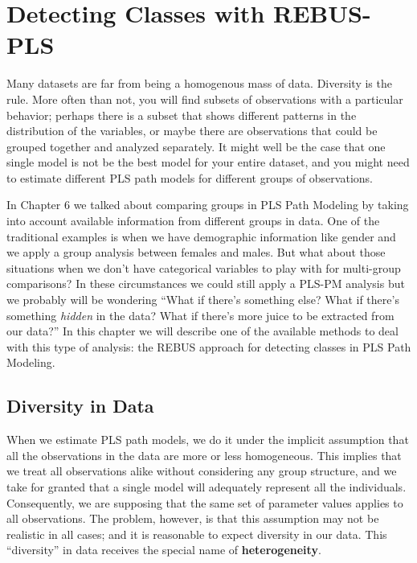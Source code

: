\documentclass[12pt]{book}\usepackage{graphicx, color}
\begin{document}



\chapter{Detecting Classes with REBUS-PLS}
Many datasets are far from being a homogenous mass of data. Diversity is the rule. More often than not, you will find subsets of observations with a particular behavior; perhaps there is a subset that shows different patterns in the distribution of the variables, or maybe there are observations that could be grouped together and analyzed separately. It might well be the case that one single model is not be the best model for your entire dataset, and you might need to estimate different PLS path models for different groups of observations.

In Chapter 6 we talked about comparing groups in PLS Path Modeling by taking into account available information from different groups in data. One of the traditional examples is when we have demographic information like gender and we apply a group analysis between females and males. But what about those situations when we don't have categorical variables to play with for multi-group comparisons? In these circumstances we could still apply a PLS-PM analysis but we probably will be wondering ``What if there's something else? What if there's something \textit{hidden} in the data? What if there's more juice to be extracted from our data?'' In this chapter we will describe one of the available methods to deal with this type of analysis: the REBUS approach for detecting classes in PLS Path Modeling.



\section{Diversity in Data}
When we estimate PLS path models, we do it under the implicit assumption that all the observations in the data are more or less homogeneous. This implies that we treat all observations alike without considering any group structure, and we take for granted that a single model will adequately represent all the individuals. Consequently, we are supposing that the same set of parameter values applies to all observations. The problem, however, is that this assumption may not be realistic in all cases; and it is reasonable to expect diversity in our data. This ``diversity'' in data receives the special name of \textbf{heterogeneity}.
\end{document}
